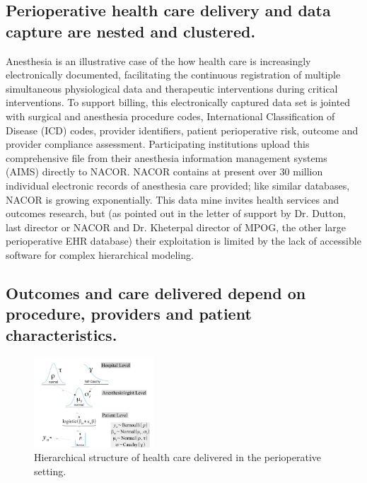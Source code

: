 \documentclass[11pt,notitlepage]{article}
\begin{document}
\subsection*{Perioperative health care delivery and data capture are nested and clustered.}
Anesthesia is an illustrative case of the how health care is increasingly electronically documented, facilitating the continuous registration of multiple simultaneous physiological data and therapeutic interventions during critical interventions. To support billing, this electronically captured data set is jointed with surgical and anesthesia procedure codes, International Classification of Disease (ICD) codes, provider identifiers, patient perioperative risk, outcome and provider compliance assessment. Participating institutions upload this comprehensive file from their anesthesia information management systems (AIMS) directly to NACOR. NACOR contains at present over 30 million individual electronic records of anesthesia care provided; like similar databases, NACOR is growing exponentially. This data mine invites health services and outcomes research, but (as pointed out in the letter of support by Dr. Dutton, last director or NACOR and Dr. Kheterpal director of MPOG, the other large perioperative EHR database) their exploitation is limited by the lack of accessible software for complex hierarchical modeling.

\subsection*{Outcomes and care delivered depend on procedure, providers and patient characteristics.} 

\begin{figure} 
\includegraphics[width=0.4\textwidth]{Figures/DistrogramNACOR.pdf} 
\caption{Hierarchical structure of health care delivered in the perioperative setting.}
\label{fig:NACOR}
\end{figure}
\end{document}

